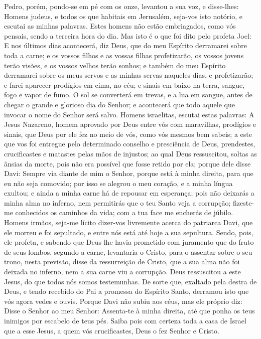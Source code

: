Pedro, porém, pondo-se em pé com os onze, levantou a sua voz, e
disse-lhes: Homens judeus, e todos os que habitais em Jerusalém,
seja-vos isto notório, e escutai as minhas palavras. Estes
homens não estão embriagados, como vós pensais, sendo a terceira
hora do dia. Mas isto é o que foi dito pelo profeta Joel:
E nos últimos dias acontecerá, diz Deus, que do meu Espírito
derramarei sobre toda a carne; e os vossos filhos e as vossas filhas
profetizarão, os vossos jovens terão visões, e os vossos velhos
terão sonhos; e também do meu Espírito derramarei sobre os
meus servos e as minhas servas naqueles dias, e profetizarão;
e farei aparecer prodígios em cima, no céu; e sinais em baixo
na terra, sangue, fogo e vapor de fumo. O sol se converterá
em trevas, e a lua em sangue, antes de chegar o grande e glorioso
dia do Senhor; e acontecerá que todo aquele que invocar o
nome do Senhor será salvo. Homens israelitas, escutai estas
palavras: A Jesus Nazareno, homem aprovado por Deus entre vós com
maravilhas, prodígios e sinais, que Deus por ele fez no meio de vós,
como vós mesmos bem sabeis; a este que vos foi entregue pelo
determinado conselho e presciência de Deus, prendestes,
crucificastes e matastes pelas mãos de injustos; ao qual Deus
ressuscitou, soltas as ânsias da morte, pois não era possível que
fosse retido por ela; porque dele disse Davi: Sempre via
diante de mim o Senhor, porque está à minha direita, para que eu não
seja comovido; por isso se alegrou o meu coração, e a minha
língua exultou; e ainda a minha carne há de repousar em esperança;
pois não deixarás a minha alma no inferno, nem permitirás que
o teu Santo veja a corrupção; fizeste-me conhecidos os
caminhos da vida; com a tua face me encherás de júbilo.
Homens irmãos, seja-me lícito dizer-vos livremente acerca do
patriarca Davi, que ele morreu e foi sepultado, e entre nós está até
hoje a sua sepultura. Sendo, pois, ele profeta, e sabendo que
Deus lhe havia prometido com juramento que do fruto de seus lombos,
segundo a carne, levantaria o Cristo, para o assentar sobre o seu
trono, nesta previsão, disse da ressurreição de Cristo, que a
sua alma não foi deixada no inferno, nem a sua carne viu a
corrupção. Deus ressuscitou a este Jesus, do que todos nós
somos testemunhas. De sorte que, exaltado pela destra de
Deus, e tendo recebido do Pai a promessa do Espírito Santo, derramou
isto que vós agora vedes e ouvis. Porque Davi não subiu aos
céus, mas ele próprio diz: Disse o Senhor ao meu Senhor: Assenta-te
à minha direita, até que ponha os teus inimigos por escabelo
de teus pés. Saiba pois com certeza toda a casa de Israel que
a esse Jesus, a quem vós crucificastes, Deus o fez Senhor e Cristo.

